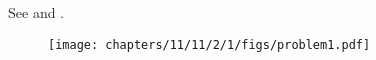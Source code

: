 See 
and 
.
\begin{figure}[H]
	\begin{center}
		\texttt{[image: chapters/11/11/2/1/figs/problem1.pdf]}
	\end{center}
\caption{}
\label{fig:11/11/2/1Fig1}
\end{figure}
